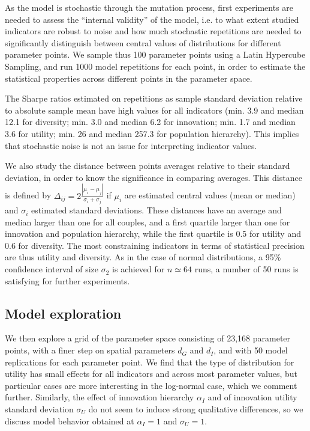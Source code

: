 \documentclass[letterpaper]{article}
\begin{document}
As the model is stochastic through the mutation process, first experiments are needed to assess the ``internal validity'' of the model, i.e. to what extent studied indicators are robust to noise and how much stochastic repetitions are needed to significantly distinguish between central values of distributions for different parameter points. We sample thus 100 parameter points using a Latin Hypercube Sampling, and run 1000 model repetitions for each point, in order to estimate the statistical properties across different points in the parameter space.

The Sharpe ratios estimated on repetitions as sample standard deviation relative to absolute sample mean have high values for all indicators (min. 3.9 and median 12.1 for diversity; min. 3.0 and median 6.2 for innovation; min. 1.7 and median 3.6 for utility; min. 26 and median 257.3 for population hierarchy). This implies that stochastic noise is not an issue for interpreting indicator values.

We also study the distance between points averages relative to their standard deviation, in order to know the significance in comparing averages. This distance is defined by $\Delta_{ij} = 2\frac{\left|\mu_i - \mu_j \right|}{\sigma_i + \sigma_j}$ if $\mu_i$ are estimated central values (mean or median) and $\sigma_i$ estimated standard deviations. These distances have an average and median larger than one for all couples, and a first quartile larger than one for innovation and population hierarchy, while the first quartile is 0.5 for utility and 0.6 for diversity. The most constraining indicators in terms of statistical precision are thus utility and diversity. As in the case of normal distributions, a 95\% confidence interval of size $\sigma_2$ is achieved for $n\simeq 64$ runs, a number of 50 runs is satisfying for further experiments.


\subsection{Model exploration}

We then explore a grid of the parameter space consisting of 23,168 parameter points, with a finer step on spatial parameters $d_G$ and $d_I$, and with 50 model replications for each parameter point. We find that the type of distribution for utility has small effects for all indicators and across most parameter values, but particular cases are more interesting in the log-normal case, which we comment further. Similarly, the effect of innovation hierarchy $\alpha_I$ and of innovation utility standard deviation $\sigma_U$ do not seem to induce strong qualitative differences, so we discuss model behavior obtained at $\alpha_I = 1$ and $\sigma_U = 1$.
\end{document}
